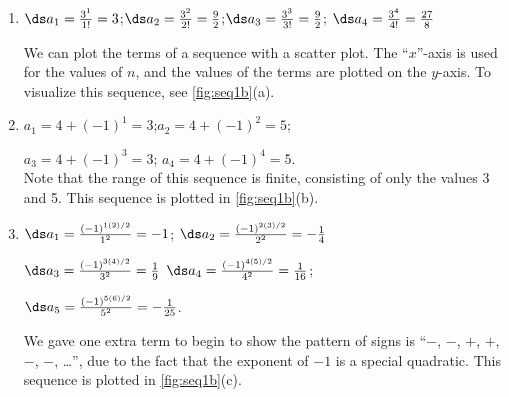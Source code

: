 {\begin{enumerate}
\item		$\ds a_1=\frac{3^1}{1!} = 3$;\qquad	$\ds a_2= \frac{3^2}{2!} = \frac92$;\qquad $\ds a_3 = \frac{3^3}{3!} = \frac92$; \qquad $\ds a_4 = \frac{3^4}{4!} = \frac{27}8$

We can plot the terms of a sequence with a scatter plot. The ``$x$''-axis is used for the values of $n$, and the values of the terms are plotted on the $y$-axis. To visualize this sequence, see \autoref{fig:seq1b}(a).

\item		$a_1= 4+(-1)^1 = 3$;\qquad $a_2 = 4+(-1)^2 = 5$; 

\noindent $a_3=4+(-1)^3 = 3$; \qquad $a_4 = 4+(-1)^4 = 5$.\\
Note that the range of this sequence is finite, consisting of only the values 3 and 5. This sequence is plotted in \autoref{fig:seq1b}(b).

\item		$\ds a_1= \frac{(-1)^{1(2)/2}}{1^2} = -1$; \qquad $\ds a_2 = \frac{(-1)^{2(3)/2}}{2^2} =-\frac14$

\noindent $\ds a_3 = \frac{(-1)^{3(4)/2}}{3^2} = \frac19$ \qquad $\ds a_4 = \frac{(-1)^{4(5)/2}}{4^2} = \frac1{16}$; 

\noindent $\ds a_5 = \frac{(-1)^{5(6)/2}}{5^2}=-\frac1{25}$.

\noindent We gave one extra term to begin to show the pattern of signs is ``$-$, $-$, $+$, $+$, $-$, $-$, \ldots'', due to the fact that the exponent of $-1$ is a special quadratic. This sequence is plotted in \autoref{fig:seq1b}(c).\eoehere
\end{enumerate}}

